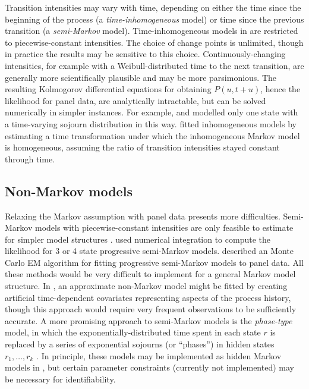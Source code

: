 \documentclass[article,shortnames]{jss}
\begin{document}
Transition intensities may vary with time, depending on either the
time since the beginning of the process (a \emph{time-inhomogeneous}
model) or time since the previous transition (a \emph{semi-Markov}
model).  Time-inhomogeneous models in  are restricted to
piecewise-constant intensities. The choice of change points is
unlimited, though in practice the results may be sensitive to this
choice.  Continuously-changing intensities, for example with a
Weibull-distributed time to the next transition, are generally more
scientifically plausible and may be more parsimonious.  The resulting
Kolmogorov differential equations for obtaining $P(u,t+u)$, hence the
likelihood for panel data, are analytically intractable, but can be
solved numerically in simpler instances.  For example,
\citet{hsiuhsichen2004smn} and \citet{hsieh2002acd} modelled only one
state with a time-varying sojourn distribution in this way.
\citet{hubbard2008mnm} fitted inhomogeneous models by estimating a
time transformation under which the inhomogeneous Markov model is
homogeneous, assuming the ratio of transition intensities stayed
constant through time.

\subsection{Non-Markov models}

Relaxing the Markov assumption with panel data presents more
difficulties.  Semi-Markov models with piecewise-constant intensities
are only feasible to estimate for simpler model structures
\citep{titman}.  \citet{foucher2008fsm:jss} used numerical integration to
compute the likelihood for 3 or 4 state progressive semi-Markov
models.  \citet{titman} described an Monte Carlo EM algorithm for
fitting progressive semi-Markov models to panel data.  All these
methods would be very difficult to implement for a general Markov
model structure.  In , an approximate non-Markov model might
be fitted by creating artificial time-dependent covariates
representing aspects of the process history, though this approach
would require very frequent observations to be sufficiently accurate.
A more promising approach to semi-Markov models is the
\emph{phase-type} model, in which the exponentially-distributed time
spent in each state $r$ is replaced by a series of exponential
sojourns (or ``phases'') in hidden states $r_1,\ldots,r_k$
\citep{titman:phasetype:jss}.  In principle, these models may be
implemented as hidden Markov models in , but certain
parameter constraints (currently not implemented) may be necessary for
identifiability.
\end{document}
